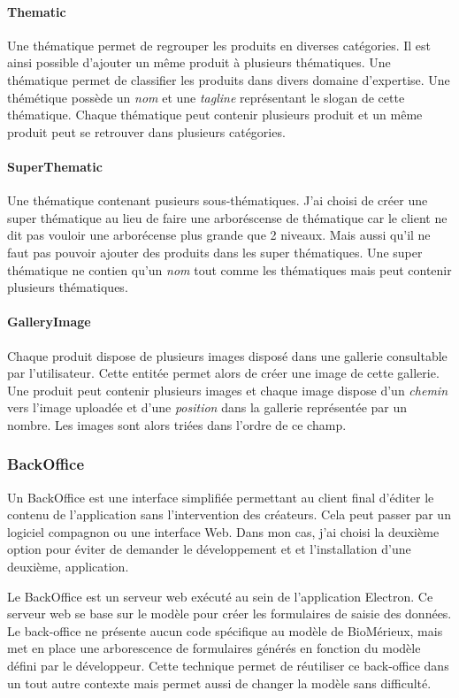 \paragraph{Thematic} Une thématique permet de regrouper les produits en diverses catégories.
Il est ainsi possible d'ajouter un même produit à plusieurs thématiques.
Une thématique permet de classifier les produits dans divers domaine d'expertise.
Une thémétique possède un \emph{nom} et une \emph{tagline} représentant le slogan de cette thématique.
Chaque thématique peut contenir plusieurs produit et un même produit peut se retrouver dans plusieurs catégories.

\paragraph{SuperThematic} Une thématique contenant pusieurs sous-thématiques.
J'ai choisi de créer une super thématique au lieu de faire une arboréscense de thématique car le client ne dit pas vouloir une arborécense plus grande que 2 niveaux.
Mais aussi qu'il ne faut pas pouvoir ajouter des produits dans les super thématiques.
Une super thématique ne contien qu'un \emph{nom} tout comme les thématiques mais peut contenir plusieurs thématiques.

\paragraph{GalleryImage} Chaque produit dispose de plusieurs images disposé dans une gallerie consultable par l'utilisateur.
Cette entitée permet alors de créer une image de cette gallerie.
Une produit peut contenir plusieurs images et chaque image dispose d'un \emph{chemin} vers l'image uploadée et d'une \emph{position} dans la gallerie représentée par un nombre.
Les images sont alors triées dans l'ordre de ce champ.

\subsubsection{BackOffice}

Un BackOffice est une interface simplifiée permettant au client final d'éditer le contenu de l'application sans l'intervention des créateurs.
Cela peut passer par un logiciel compagnon ou une interface Web.
Dans mon cas, j'ai choisi la deuxième option pour éviter de demander le développement et et l'installation d'une deuxième, application.

Le BackOffice est un serveur web exécuté au sein de l'application Electron.
Ce serveur web se base sur le modèle pour créer les formulaires de saisie des données.
Le back-office ne présente aucun code spécifique au modèle de BioMérieux, mais met en place une arborescence de formulaires générés en fonction du modèle défini par le développeur.
Cette technique permet de réutiliser ce back-office dans un tout autre contexte mais permet aussi de changer la modèle sans difficulté.

